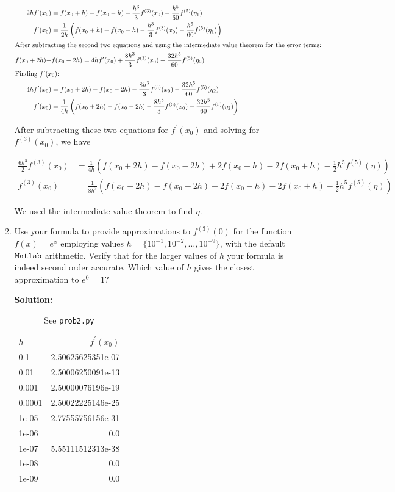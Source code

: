 \documentclass[12pt]{article}
\begin{document}
\begin{enumerate}
\begin{enumerate}
\begin{align*}
2hf^{\prime}(x_{0}) &= f(x_{0} + h) - f(x_{0} - h) - \frac{h^{3}}{3}f^{(3)}(x_{0}) - \frac{h^{5}}{60}f^{(5)}(\eta_{1})\\
f^{\prime}(x_{0}) &= \frac{1}{2h}\left( f(x_{0} + h) - f(x_{0} - h) - \frac{h^{3}}{3}f^{(3)}(x_{0}) - \frac{h^{5}}{60}f^{(5)}(\eta_{1})\right)\\
\intertext{After subtracting the second two equations and using the intermediate value theorem for the error terms:}
f(x_{0} + 2h) -& f(x_{0} - 2h) = 4hf^{\prime}(x_{0}) + \frac{8h^{3}}{3}f^{(3)}(x_{0}) + \frac{32h^{5}}{60}f^{(5)}(\eta_{2})\\
\intertext{Finding $f^{\prime}(x_{0})$:}
4hf^{\prime}(x_{0}) &= f(x_{0} + 2h) - f(x_{0} - 2h) - \frac{8h^{3}}{3}f^{(3)}(x_{0}) - \frac{32h^{5}}{60}f^{(5)}(\eta_{2})\\
f^{\prime}(x_{0}) &= \frac{1}{4h}\left( f(x_{0} + 2h) - f(x_{0} - 2h) - \frac{8h^{3}}{3}f^{(3)}(x_{0}) - \frac{32h^{5}}{60}f^{(5)}(\eta_{2})\right)
\end{align*}

After subtracting these two equations for $f^{\prime}(x_{0})$ and solving for $f^{(3)}(x_{0})$, we have

\begin{align*}
\frac{6h^{3}}{2}f^{(3)}(x_{0}) &= \frac{1}{4h}\left( f(x_{0} + 2h) - f(x_{0} - 2h) + 2f(x_{0} - h) - 2f(x_{0} + h) - \frac{1}{2}h^{5}f^{(5)}(\eta)\right)\\
f^{(3)}(x_{0}) &=\frac{1}{8h^{3}}\left( f(x_{0} + 2h) - f(x_{0} - 2h) + 2f(x_{0} - h) - 2f(x_{0} + h) - \frac{1}{2}h^{5}f^{(5)}(\eta)\right)
\end{align*}

We used the intermediate value theorem to find $\eta$. 

\item Use your formula to provide approximations to $f^{(3)}(0)$ for the function $f(x) = e^{x}$ employing values $h = \{ 10^{-1}, 10^{-2}, \ldots, 10^{-9}\}$, with the default ${\tt Matlab}$ arithmetic. Verify that for the larger values of $h$ your formula is indeed second order accurate. Which value of $h$ gives the closest approximation to $e^{0} = 1$?

{\bf Solution:}

\begin{table}[H]
\centering
\begin{tabular}{l r}
\hline \hline
$h$ & $f^{\prime}(x_{0})$\\
\hline
0.1 & 2.50625625351e-07\\
0.01 & 2.50006250091e-13\\
0.001 & 2.50000076196e-19\\
0.0001 & 2.50022225146e-25\\
1e-05 & 2.77555756156e-31\\
1e-06 & 0.0\\
1e-07 & 5.55111512313e-38\\
1e-08 & 0.0\\
1e-09 & 0.0\\
\hline
\end{tabular}
\caption{See {\tt prob2.py}}
\end{table}


\end{enumerate}
\end{enumerate}
\end{document}
